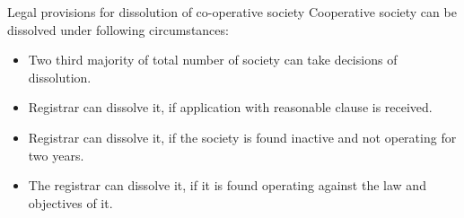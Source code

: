 \documentclass[12pt,ignorenonframetext,aspectratio=169]{beamer}
\providecommand{\tightlist}{%
  \setlength{\itemsep}{0pt}\setlength{\parskip}{0pt}}
\begin{document}
\begin{frame}{Legal provisions for dissolution of co-operative society}
\protect\hypertarget{legal-provisions-for-dissolution-of-co-operative-society}{}
Cooperative society can be dissolved under following circumstances:

\begin{itemize}
\tightlist
\item
  Two third majority of total number of society can take decisions of
  dissolution.
\item
  Registrar can dissolve it, if application with reasonable clause is
  received.
\item
  Registrar can dissolve it, if the society is found inactive and not
  operating for two years.
\item
  The registrar can dissolve it, if it is found operating against the
  law and objectives of it.
\end{itemize}
\end{frame}
\end{document}
